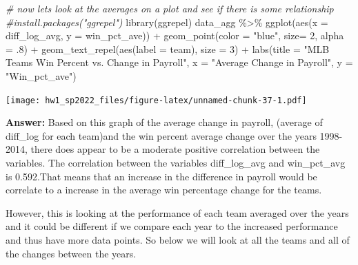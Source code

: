 \documentclass[
]{article}
\newenvironment{Shaded}{\begin{snugshade}}{\end{snugshade}}
\newcommand{\AttributeTok}[1]{\textcolor[rgb]{0.77,0.63,0.00}{#1}}
\newcommand{\CommentTok}[1]{\textcolor[rgb]{0.56,0.35,0.01}{\textit{#1}}}
\newcommand{\DecValTok}[1]{\textcolor[rgb]{0.00,0.00,0.81}{#1}}
\newcommand{\FunctionTok}[1]{\textcolor[rgb]{0.00,0.00,0.00}{#1}}
\newcommand{\NormalTok}[1]{#1}
\newcommand{\SpecialCharTok}[1]{\textcolor[rgb]{0.00,0.00,0.00}{#1}}
\newcommand{\StringTok}[1]{\textcolor[rgb]{0.31,0.60,0.02}{#1}}
\begin{document}
\begin{Shaded}
\begin{Highlighting}[]
\CommentTok{\# now let\textquotesingle{}s look at the averages on a plot and see if there is some relationship}
\CommentTok{\#install.packages("ggrepel")}
\FunctionTok{library}\NormalTok{(ggrepel)}
\NormalTok{data\_agg }\SpecialCharTok{\%\textgreater{}\%}
  \FunctionTok{ggplot}\NormalTok{(}\FunctionTok{aes}\NormalTok{(}\AttributeTok{x =}\NormalTok{ diff\_log\_avg, }\AttributeTok{y =}\NormalTok{ win\_pct\_ave)) }\SpecialCharTok{+} 
  \FunctionTok{geom\_point}\NormalTok{(}\AttributeTok{color =} \StringTok{"blue"}\NormalTok{, }\AttributeTok{size=} \DecValTok{2}\NormalTok{, }\AttributeTok{alpha =}\NormalTok{ .}\DecValTok{8}\NormalTok{) }\SpecialCharTok{+} 
  \FunctionTok{geom\_text\_repel}\NormalTok{(}\FunctionTok{aes}\NormalTok{(}\AttributeTok{label =}\NormalTok{ team), }\AttributeTok{size =} \DecValTok{3}\NormalTok{) }\SpecialCharTok{+}
  \FunctionTok{labs}\NormalTok{(}\AttributeTok{title =} \StringTok{"MLB Team\textquotesingle{}s Win Percent  vs. Change in Payroll"}\NormalTok{, }
       \AttributeTok{x =} \StringTok{"Average Change in Payroll"}\NormalTok{, }
       \AttributeTok{y =} \StringTok{"Win\_pct\_ave"}\NormalTok{)}
\end{Highlighting}
\end{Shaded}

\texttt{[image: hw1\_sp2022\_files/figure-latex/unnamed-chunk-37-1.pdf]}

\begin{Shaded}
\end{Shaded}

\textbf{Answer:} Based on this graph of the average change in payroll,
(average of diff\_log for each team)and the win percent average change
over the years 1998-2014, there does appear to be a moderate positive
correlation between the variables. The correlation between the variables
diff\_log\_avg and win\_pct\_avg is 0.592.That means that an increase in
the difference in payroll would be correlate to a increase in the
average win percentage change for the teams.

However, this is looking at the performance of each team averaged over
the years and it could be different if we compare each year to the
increased performance and thus have more data points. So below we will
look at all the teams and all of the changes between the years.
\end{document}
